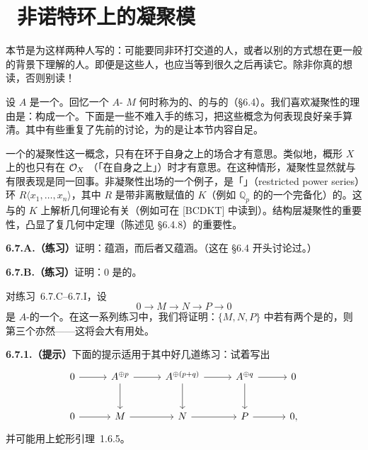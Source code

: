 
\section{\extrahard\ 非诺特环上的凝聚模}

本节是为这样两种人写的：可能要同非\trNoetherian{}环打交道的人，或者以别的方式想在更一般的背景下理解\trCoherentSheaf{}的人。即便是这些人，也应当等到很久之后再读它。除非你真的想读，否则别读！

设 $A$ 是一个\trRing。回忆一个 $A$-\trModule{} $M$ 何时称为\trFinitelyGenerated{}的、\trFinitelyPresented{}的与\trCoh{}的（\S6.4）。我们喜欢凝聚性的理由是：\trCoh{}\trModule{}构成一个\trAbelianCategory。下面是一些不难入手的练习，把这些概念为何表现良好亲手算清。其中有些重复了先前的讨论，为的是让本节内容自足。

一个\trModule{}的凝聚性这一概念，只有在环于自身之上\trCoh{}的场合才有意思。类似地，概形 $X$ 上的\trCoherentSheaf{}也只有在 $\mathcal{O}_X$ \trCoh{}（「在自身之上」）时才有意思。在这种情形，凝聚性显然就与有限表现是同一回事。非\trNoetherian{}凝聚性出场的一个例子，是「\trRestrictedPowerSeries{}」（restricted power series）环 $R\langle x_1,\dots,x_n\rangle$，其中 $R$ 是带非离散赋值的 $K$（例如 $\mathbb{Q}_p$ 的\trAlgebraicClosure{}的一个完备化）的\trValuationRing{}。这与\trTate{}的 $K$ 上\trNonArchimedean{}解析几何理论有关（例如可在 [BCDKT] 中读到）。结构层凝聚性的重要性，凸显了复几何中\trOka{}定理（陈述见 \S6.4.8）的重要性。

\textbf{6.7.A.（练习）}\quad 证明：\trCoh{}蕴涵\trFinitelyPresented，而后者又蕴涵\trFinitelyGenerated。（这在 \S6.4 开头讨论过。）

\textbf{6.7.B.（练习）}\quad 证明：$0$ 是\trCoh{}的。

对练习~6.7.C--6.7.I，设
\begin{equation*}\tag{6.7.0.1}\label{eq:coherent-exercise-sequence}
0\longrightarrow M\longrightarrow N\longrightarrow P\longrightarrow 0
\end{equation*}
是 $A$-\trModule{}的一个\trExactSequence。在这一系列练习中，我们将证明：$\{M,N,P\}$ 中若有两个是\trCoh{}的，则第三个亦然——这将会大有用处。

\textbf{6.7.1.（提示）}\quad 下面的提示适用于其中好几道练习：试着写出
\[
\begin{tikzcd}[row sep=2.6em, column sep=2.8em]
0 \ar[r] & A^{\oplus p} \ar[r] \ar[d] & A^{\oplus(p+q)} \ar[r] \ar[d] & A^{\oplus q} \ar[r] \ar[d] & 0 \\
0 \ar[r] & M \ar[r] & N \ar[r] & P \ar[r] & 0{,}
\end{tikzcd}
\]
并可能用上蛇形引理~1.6.5。

